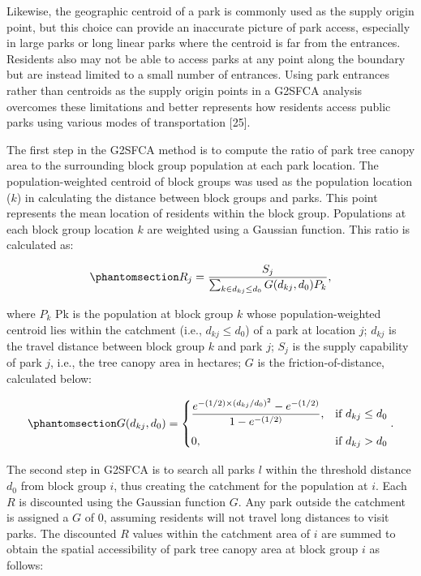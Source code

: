 \documentclass[
  sn-basic,
]{sn-jnl}
\begin{document}
Likewise, the geographic centroid of a park is commonly used as the
supply origin point, but this choice can provide an inaccurate picture
of park access, especially in large parks or long linear parks where the
centroid is far from the entrances. Residents also may not be able to
access parks at any point along the boundary but are instead limited to
a small number of entrances. Using park entrances rather than centroids
as the supply origin points in a G2SFCA analysis overcomes these
limitations and better represents how residents access public parks
using various modes of transportation {[}25{]}.

The first step in the G2SFCA method is to compute the ratio of park tree
canopy area to the surrounding block group population at each park
location. The population-weighted centroid of block groups was used as
the population location (\(k\)) in calculating the distance between
block groups and parks. This point represents the mean location of
residents within the block group. Populations at each block group
location \(k\) are weighted using a Gaussian function. This ratio is
calculated as:

\begin{equation}\protect\phantomsection\label{eq-sd-ratio}{R_j = \frac{S_j}{\sum_{k \in {d_{kj} \leq d_0}} G(d_{kj}, d_0)P_k},}\end{equation}

where \(P_k\) Pk is the population at block group \(k\) whose
population-weighted centroid lies within the catchment (i.e.,
\(d_{kj} \leq d_0\)) of a park at location \(j\); \(d_{kj}\) is the
travel distance between block group \(k\) and park \(j\); \(S_j\) is the
supply capability of park \(j\), i.e., the tree canopy area in hectares;
\(G\) is the friction-of-distance, calculated below:

\begin{equation}\protect\phantomsection\label{eq-gaussian}{G(d_{kj}, d_0) = 
\begin{cases}
\dfrac{e^{-(1/2) \times (d_{kj}/d_0)^2} - e^{-(1/2)}}{1 - e^{-(1/2)}}, & \text{if } d_{kj} \leq d_0 \\[10pt]
0, & \text{if } d_{kj} > d_0
\end{cases} .}\end{equation}

The second step in G2SFCA is to search all parks \(l\) within the
threshold distance \(d_0\) from block group \(i\), thus creating the
catchment for the population at \(i\). Each \(R\) is discounted using
the Gaussian function \(G\). Any park outside the catchment is assigned
a \(G\) of 0, assuming residents will not travel long distances to visit
parks. The discounted \(R\) values within the catchment area of \(i\)
are summed to obtain the spatial accessibility of park tree canopy area
at block group \(i\) as follows:
\end{document}
